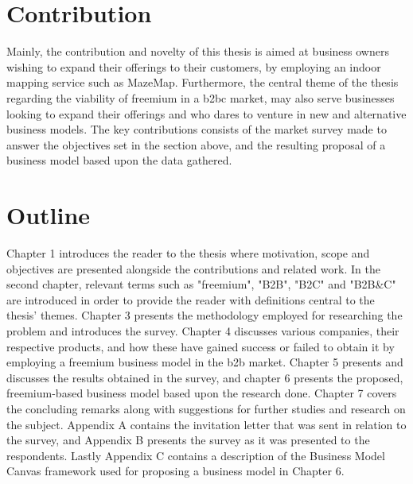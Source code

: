 \section{Contribution}
Mainly, the contribution and novelty of this thesis is aimed at business owners wishing to expand their offerings to their customers, by employing an indoor mapping service such as MazeMap. Furthermore, the central theme of the thesis regarding the viability of freemium in a \gls{b2bc} market, may also serve businesses looking to expand their offerings and who dares to venture in new and alternative business models. The key contributions consists of the market survey made to answer the objectives set in the section above, and the resulting proposal of a business model based upon the data gathered.   

\section{Outline}
Chapter 1 introduces the reader to the thesis where motivation, scope and objectives are presented alongside the contributions and related work. In the second chapter, relevant terms such as "freemium", "B2B", "B2C" and "B2B\&C" are introduced in order to provide the reader with definitions central to the thesis' themes. Chapter 3 presents the methodology employed for researching the problem and introduces the survey. Chapter 4 discusses various companies, their respective products, and how these have gained success or failed to obtain it by employing a freemium business model in the \gls{b2b} market. Chapter 5 presents and discusses the results obtained in the survey, and chapter 6 presents the proposed, freemium-based business model based upon the research done.
Chapter 7 covers the concluding remarks along with suggestions for further studies and research on the subject. Appendix A contains the invitation letter that was sent in relation to the survey, and Appendix B presents the survey as it was presented to the respondents. Lastly Appendix C contains a description of the Business Model Canvas framework used for proposing a business model in Chapter 6. 


